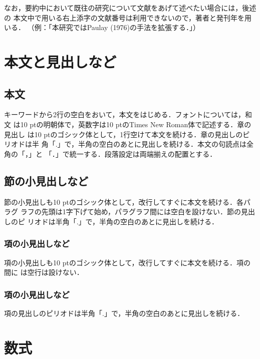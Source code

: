 \documentclass{jaee}
\begin{document}
なお，要約中において既往の研究について文献をあげて述べたい場合には，後述の
本文中で用いる右上添字の文献番号は利用できないので，著者と発刊年を用いる．
（例：「本研究ではPaulay (1976)の手法を拡張する．」）

\section{本文と見出しなど}
\label{sec:5}\vspace{-\baselineskip}

\subsection{本文}
\label{sec:5-1}

キーワードから2行の空白をおいて，本文をはじめる．フォントについては，和文
は10 ptの明朝体で，英数字は10 ptのTimes New Roman体で記述する．章の見出し
は10 ptのゴシック体として，1行空けて本文を続ける．章の見出しのピリオドは半
角「.」で，半角の空白のあとに見出しを続ける．本文の句読点は全角の「，」と
「．」で統一する．段落設定は両端揃えの配置とする．

\subsection{節の小見出しなど}
\label{sec:5-2}

節の小見出しも10 ptのゴシック体として，改行してすぐに本文を続ける．各パラグ
ラフの先頭は1字下げて始め，パラグラフ間には空白を設けない．節の見出しのピ
リオドは半角「.」で，半角の空白のあとに見出しを続ける．

\subsubsection{項の小見出しなど}
\label{sec:5-2-1}

項の小見出しも10 ptのゴシック体として，改行してすぐに本文を続ける．項の間に
は空行は設けない．

\subsubsection{項の小見出しなど}
\label{sec:5-2-2}

項の見出しのピリオドは半角「.」で，半角の空白のあとに見出しを続ける．

\section{数式}
\label{sec:6}
\end{document}
